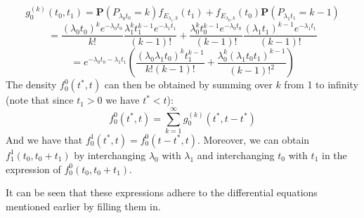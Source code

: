 $$
g_0^{(k)}(t_0,t_1)=\mathbf{P}(P_{\lambda_0t_0}=k)f_{E_{\lambda_1,k}}(t_1)+f_{E_{\lambda_0,k}}(t_0)\mathbf{P}(P_{\lambda_1t_1}=k-1)
$$
$$
=\frac{(\lambda_0t_0)^ke^{-\lambda_0t_0}}{k!}\frac{\lambda_1^kt_1^{k-1}e^{-\lambda_1t_1}}{(k-1)!}+\frac{\lambda_0^kt_0^{k-1}e^{-\lambda_0t_0}}{(k-1)!}\frac{(\lambda_1t_1)^{k-1}e^{-\lambda_1t_1}}{(k-1)!}
$$
$$
=e^{-\lambda_0t_0-\lambda_1t_1}(\frac{(\lambda_0\lambda_1t_0)^kt_1^{k-1}}{k!(k-1)!}+\frac{\lambda_0^k(\lambda_1t_0t_1)^{k-1}}{(k-1)!^2})
$$
The density $f_0^0(t^*,t)$ can then be obtained by summing over $k$ from 1 to infinity (note that since $t_1>0$ we have $t^*<t$):
$$
f_0^0(t^*,t)=\sum\limits_{k=1}^\infty g_0^{(k)}(t^*,t-t^*)
$$
And we have that $f_0^1(t^*,t)=f_0^0(t-t^*,t)$. Moreover, we can obtain $f_1^1(t_0,t_0+t_1)$ by interchanging $\lambda_0$ with $\lambda_1$ and interchanging $t_0$ with $t_1$ in the expression of $f_0^0(t_0,t_0+t_1)$.

It can be seen that these expressions adhere to the differential equations mentioned earlier by filling them in.

